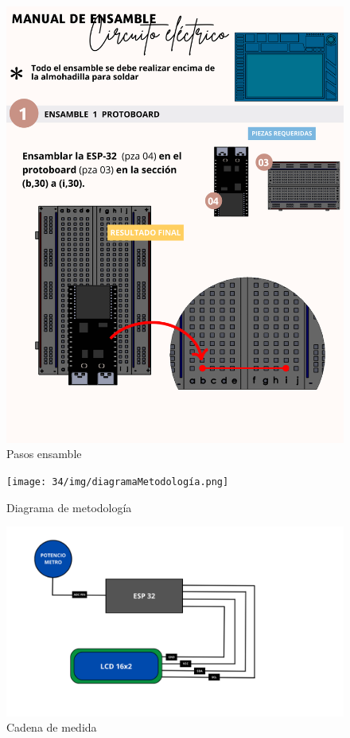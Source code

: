    \begin{figure}[H]
        \centering
        \includegraphics[trim = {1mm 1mm 1mm 1mm},clip,scale=0.2]{34/img/pasosEnsamble.png}
        \caption{Pasos ensamble}
        \label{fig:enter-label3}
    \end{figure}
    \begin{figure}[H]
        \centering
        \texttt{[image: 34/img/diagramaMetodología.png]}
        \caption{Diagrama de metodología}
        \label{fig:enter-label4}
    \end{figure}
    
    \begin{figure}[H]
        \centering
        \includegraphics[trim = {1mm 1mm 1mm 1mm},clip,scale=0.2]{34/img/cadenaDeMedida.png}
        \caption{Cadena de medida}
        \label{fig:enter-label5}
    \end{figure}
    
